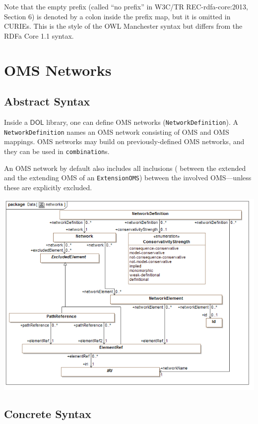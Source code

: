 \documentclass[10pt,fleqn,final]{scrreprt}
\newcommand{\cbs}[0]{\color{red}\xspace} %
\newcommand{\cbe}[0]{\color{black}\xspace} %
\newcommand*{\syntax}[1]{\texttt{#1}}
\newcommand*{\DOL}{\ensuremath{\mathsf{DOL}}\xspace}
\newcommand{\sclause}[1]{\section{#1}}
\newcommand{\ssclause}[1]{\subsection{#1}}
\newcommand{\nisref}[1]{#1}
\newenvironment{definitions}[0]{\medskip }{}
\begin{document}
\begin{definitions}
\begin{lstlisting}[language=ebnf,escapechar=+,morecomment={[l]{\%\%\ }}]
\end{lstlisting}

\cbs Note that the empty prefix (called ``no prefix'' in \nisref{W3C/TR REC-rdfa-core:2013, Section 6}) is denoted by a colon inside the prefix map, but it is omitted in CURIEs.\cbe  This is the style of the OWL Manchester syntax \cite{W3C:NOTE-owl2-manchester-syntax-20091027} but differs from the RDFa Core 1.1 syntax.

\vspace{1em}
	



\sclause{OMS Networks}\label{c:networks}
\ssclause{Abstract Syntax}

Inside a \DOL library, one can define OMS networks (\syntax{NetworkDefinition}).
A \syntax{NetworkDefinition} names an
OMS network consisting of  OMS and OMS mappings. OMS networks may build on previously-defined
OMS networks, and they can be used in \syntax{combination}s.  


An OMS network by default also includes all inclusions (\cbs between the extended
and the extending OMS of an\cbe{} \syntax{ExtensionOMS}) between the involved OMS---unless these are
explicitly excluded.

\medskip
\includegraphics[width=\textwidth]{mof/Class_Diagram__networks.png}


\ssclause{Concrete Syntax}


\begin{lstlisting}[language=ebnf,escapeinside={()},morecomment={[l]{\%\%\ }}]


\end{lstlisting}
\end{definitions}
\end{document}
